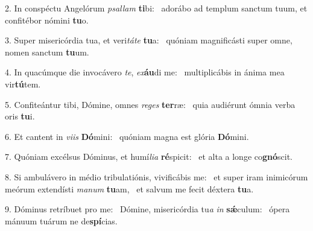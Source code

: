 2. In conspéctu Angelórum \textit{psal}\textit{lam} \textbf{ti}bi: \ast\  adorábo ad templum sanctum tuum, et confitébor nómini \textbf{tu}o.\

3. Super misericórdia tua, et veri\textit{tá}\textit{te} \textbf{tu}a: \ast\  quóniam magnificásti super omne, nomen sanctum \textbf{tu}um.\

4. In quacúmque die invocávero \textit{te}, \textit{ex}\textbf{áu}di me: \ast\  multiplicábis in ánima mea vir\textbf{tú}tem.\

5. Confiteántur tibi, Dómine, omnes \textit{re}\textit{ges} \textbf{ter}ræ: \ast\  quia audiérunt ómnia verba oris \textbf{tu}i.\

6. Et cantent in \textit{vi}\textit{is} \textbf{Dó}mini: \ast\  quóniam magna est glória \textbf{Dó}mini.\

7. Quóniam excélsus Dóminus, et humí\textit{li}\textit{a} \textbf{ré}spicit: \ast\  et alta a longe co\textbf{gnó}scit.\

8. Si ambulávero in médio tribulatiónis, vivificábis me: \dag\  et super iram inimicórum meórum extendísti \textit{ma}\textit{num} \textbf{tu}am, \ast\  et salvum me fecit déxtera \textbf{tu}a.\

9. Dóminus retríbuet pro me: \dag\  Dómine, misericórdia tu\textit{a} \textit{in} \textbf{sǽ}culum: \ast\  ópera mánuum tuárum ne de\textbf{spí}cias.\

